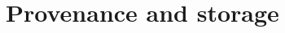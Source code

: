\documentclass[draftmode,draftwater]{memarticle}
\begin{document}

\section{Provenance and storage}



\end{document}
